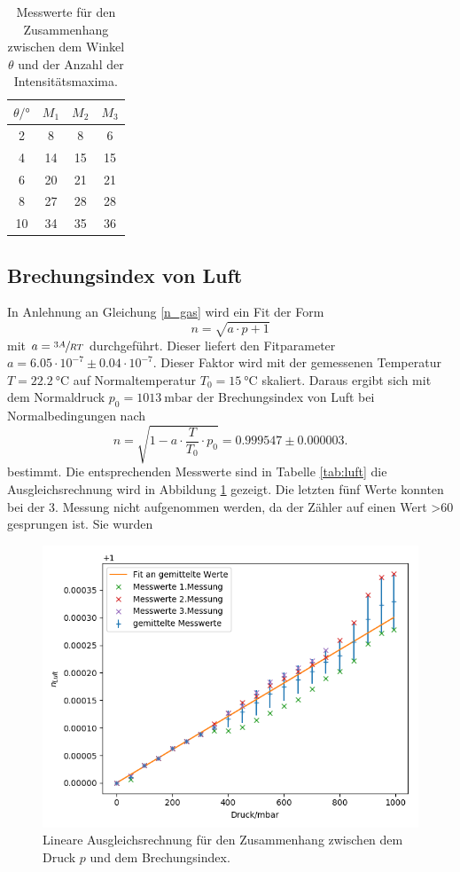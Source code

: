 \begin{table}
  \caption{Messwerte für den Zusammenhang zwischen dem Winkel $\theta$ und der Anzahl
  der Intensitätsmaxima.}
  \label{tab:glas}
  \centering
  \begin{tabular}{c|c|c|c}
    $\theta/°$ & $M_1$ & $M_2$ & $M_3$ \\ \midrule
    2 & 8 & 8 & 6 \\
    4 & 14  & 15  & 15 \\
    6 & 20  & 21  & 21 \\
    8 & 27  & 28  & 28 \\
    10 & 34 & 35  & 36
  \end{tabular}
\end{table}

\subsection{Brechungsindex von Luft}

In Anlehnung an Gleichung \ref{n_gas} wird ein Fit der Form
\[
n = \sqrt{a \cdot p + 1}
\]
mit $a = \sfrac{3A}{RT}$ durchgeführt. Dieser liefert den Fitparameter
$a = 6.05 \cdot 10^{-7} \pm 0.04 \cdot 10^{-7}$. Dieser Faktor wird mit der gemessenen Temperatur
$T = \SI{22.2}{\degreeCelsius}$ auf Normaltemperatur $T_0 = \SI{15}{\degreeCelsius}$ skaliert.
Daraus ergibt sich mit dem Normaldruck $p_0 = \SI{1013}{\milli\bar}$ der Brechungsindex von Luft bei
Normalbedingungen nach
\[
n = \sqrt{1 - a \cdot \frac{T}{T_0} \cdot p_0} = 0.999547 \pm 0.000003.
\]
bestimmt. Die entsprechenden Messwerte sind in Tabelle \ref{tab:luft} die Ausgleichsrechnung wird
in Abbildung \ref{n_luft} gezeigt. Die letzten fünf Werte konnten bei der 3. Messung nicht aufgenommen
werden, da der Zähler auf einen Wert >60 gesprungen ist. Sie wurden

\begin{figure}[h]
\centering
\includegraphics[width=\linewidth]{img/n_luft.png}
\caption{Lineare Ausgleichsrechnung für den Zusammenhang zwischen dem Druck $p$ und dem Brechungsindex.}
\label{n_luft}
\end{figure}

